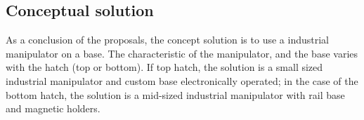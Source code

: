\subsection{Conceptual solution}
As a conclusion of the proposals, the concept solution is to use a
industrial manipulator on a base. The characteristic of the manipulator, and the base
varies with the hatch (top or bottom). If top hatch, the solution is a small
sized industrial manipulator and custom base electronically operated; in
the case of the bottom hatch, the solution is a mid-sized industrial manipulator
with rail base and magnetic holders.

